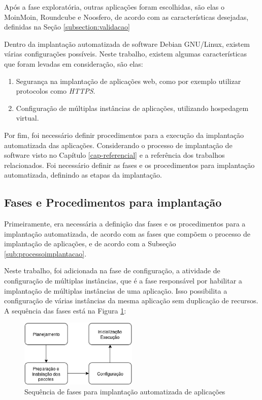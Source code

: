 Após a fase exploratória, outras aplicações foram escolhidas, são elas o MoinMoin, 
Roundcube e Noosfero, de acordo com as características desejadas, 
definidas na Seção \ref{subsection:validacao}

Dentro da implantação automatizada de software Debian GNU/Linux, existem várias
configurações possíveis. Neste trabalho, existem algumas características que foram 
levadas em consideração, são elas:

\begin{enumerate}
  \item  Segurança na implantação de aplicações web,
   como por exemplo utilizar protocolos como \textit{HTTPS}.
  \item  Configuração de múltiplas instâncias de
   aplicações, utilizando hospedagem virtual.
\end{enumerate}

Por fim, foi necessário definir procedimentos para a execução da implantação 
automatizada das aplicações. Considerando
o processo de implantação de software visto no Capítulo \ref{cap-referencial}
e a referência dos trabalhos relacionados. Foi necessário definir as fases e os
procedimentos para implantação automatizada, definindo as etapas
da implantação.

\subsection{Fases e Procedimentos para implantação}
\label{sec:fases}

Primeiramente, era necessária a definição das fases e os procedimentos para a implantação 
automatizada, de acordo com as fases que compõem o processo de 
implantação de aplicações, e de acordo com a Subseção \ref{sub:processoimplantacao}. 

Neste trabalho, foi adicionada na fase de configuração, a atividade de configuração de múltiplas
instâncias, que é a fase responsável por habilitar a implantação de múltiplas 
instâncias de uma aplicação. Isso possibilita a configuração de várias instâncias da mesma aplicação sem duplicação de recursos. A sequência
das fases está na Figura \ref{fig:1}:

\begin{figure}[h]
  \centering
  \includegraphics[width=0.5\textwidth]
      {figuras/fases}
      \caption{Sequência de fases para implantação automatizada de aplicações}
  \label{fig:1}
\end{figure}

